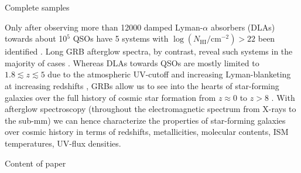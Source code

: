 \documentclass{aa}    %
\begin{document}
Complete samples







Only after observing more than 12000 damped Lyman-$\alpha$ absorbers (DLAs)
towards about 10$^5$ QSOs have 5 systems with
$\log({N_\mathrm{HI}/\mathrm{cm^{-2}}}) > 22$ been identified
\citep{Noterdaeme2012b}. Long GRB afterglow spectra, by contrast, reveal such
systems in the majority of cases \citep{Jakobsson2006a, Fynbo2009}. Whereas DLAs
towards QSOs are mostly limited to $1.8\lesssim z \lesssim 5$ due to the
atmospheric  UV-cutoff and increasing Lyman-blanketing at increasing redshifts
\citep[e.g.,][]{Rafelski2014}, GRBs allow us to see into the hearts of
star-forming galaxies over the full history of cosmic star formation from $z
\approx 0$ to $z > 8$ \citep[e.g.,][]{Tanvir2009, Salvaterra2009,
	Jakobsson2012}. With afterglow spectroscopy (throughout the electromagnetic
spectrum from X-rays to the sub-mm) we can hence characterize the properties of
star-forming galaxies over cosmic history in terms of  redshifts, metallicities,
molecular contents, ISM temperatures, UV-flux densities.

Content of paper
\end{document}
